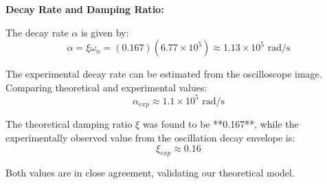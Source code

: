 \documentclass[a4paper,12pt]{article}
\begin{document}
\textbf{Decay Rate and Damping Ratio:}

The decay rate $\alpha$ is given by:
\begin{equation}
\alpha = \xi \omega_n = (0.167)(6.77 \times 10^5) \approx 1.13 \times 10^5 \text{ rad/s}
\end{equation}

The experimental decay rate can be estimated from the oscilloscope image. Comparing theoretical and experimental values:
\begin{equation}
\alpha_{exp} \approx 1.1 \times 10^5 \text{ rad/s}
\end{equation}

The theoretical damping ratio $\xi$ was found to be **0.167**, while the experimentally observed value from the oscillation decay envelope is:
\begin{equation}
\xi_{exp} \approx 0.16
\end{equation}

Both values are in close agreement, validating our theoretical model.
\end{document}
